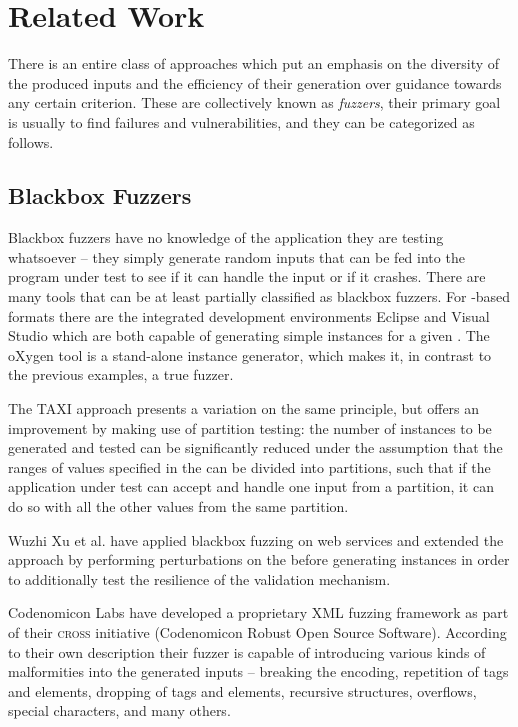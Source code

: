 \section{Related Work}
\label{sec:relwork}
There is an entire class of approaches which put an emphasis on the diversity of the produced inputs and the
efficiency of their generation over guidance towards any certain criterion. These are collectively known as
\emph{fuzzers}, their primary goal is usually to find failures and vulnerabilities, and they can be categorized
as follows.
\subsection{Blackbox Fuzzers}
Blackbox fuzzers have no knowledge of the application they are testing whatsoever -- they simply generate random
inputs that can be fed into the program under test to see if it can handle the input or if it crashes.
There are many tools that can be at least partially classified as blackbox fuzzers. For \xml-based formats
there are the integrated development environments Eclipse\cite{eclipse} and Visual Studio\cite{visual} which
are both capable of generating simple instances for a given \xsd. The oXygen\cite{oxygen} tool is a stand-alone
\xml instance generator, which makes it, in contrast to the previous examples, a true fuzzer.
 		 
The TAXI\cite{Bertolino:2007:ATD:1270230.1270257} approach presents a variation on the same principle, but
offers an improvement by making use of partition testing: the number of instances to be generated
and tested can be significantly reduced under the assumption that the ranges of values specified in the \xsd
can be divided into partitions, such that if the application under test can accept and handle one input from a
partition, it can do so with all the other values from the same partition.

Wuzhi Xu et al.\cite{1544740} have applied blackbox fuzzing on web services and extended the approach by
performing perturbations on the \xsd before generating instances in order to additionally test the resilience
of the validation mechanism.

Codenomicon Labs have developed a proprietary XML fuzzing framework\cite{codenomicon} as part of their
\textsc{cross} initiative (Codenomicon Robust Open Source Software). According to their own description their
fuzzer is capable of introducing various kinds of malformities into the generated inputs -- breaking the
encoding, repetition of tags and elements, dropping of tags and elements, recursive structures, overflows,
special characters, and many others.

